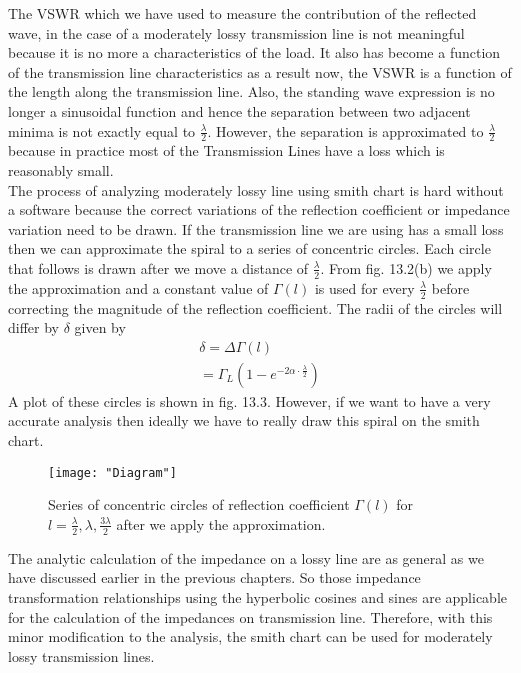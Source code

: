   The VSWR which we have used to measure the contribution of the reflected wave, in the case of a moderately lossy transmission line is not meaningful because it is no more a characteristics of the load. It also has become a function of the transmission line characteristics as a result now, the VSWR is a function of the length along the transmission line. Also, the standing wave expression is no longer a sinusoidal function and hence the separation between two adjacent minima is not exactly equal to $\frac{\lambda}{2}$. However, the separation is approximated to $\frac{\lambda}{2}$ because in practice most of the Transmission Lines have a loss which is reasonably small.\\
  
  The process of analyzing moderately lossy line using smith chart is hard without a software because the correct variations of the reflection coefficient or impedance variation need to be drawn. If the transmission line we are using has a small loss then we can approximate the spiral to a series of concentric circles. Each circle that follows is drawn after we move a distance of $\frac{\lambda}{2}$. From fig. 13.2(b) we apply the approximation and a constant value of $\Gamma{(l)}$ is used for every $\frac{\lambda}{2}$ before correcting the magnitude of the reflection coefficient. The radii of the circles will differ by $\delta$ given by
\begin{align*}
\delta = \Delta \Gamma{(l)}\\
   = \Gamma_L(1 - e^{-2\alpha\cdot \frac{\lambda}{2}})
\end{align*}
A plot of these circles is shown in fig. 13.3. However, if we want to have a very accurate analysis then ideally we have to really draw this spiral on the smith chart.
\begin{figure}[ht]
	\centering
	\texttt{[image: "Diagram"]}
	\caption{Series of concentric circles of reflection coefficient $\Gamma{(l)}$ for $l = \frac{\lambda}{2},\lambda, \frac{3\lambda}{2}$ after we apply the approximation.}
\end{figure}
The analytic calculation of the impedance on a lossy line are as general as we have discussed earlier in the previous chapters. So those impedance transformation relationships using the hyperbolic cosines and sines are applicable for the calculation of the impedances on transmission line. Therefore, with this minor modification to the analysis, the smith chart can be used for moderately lossy transmission lines.

